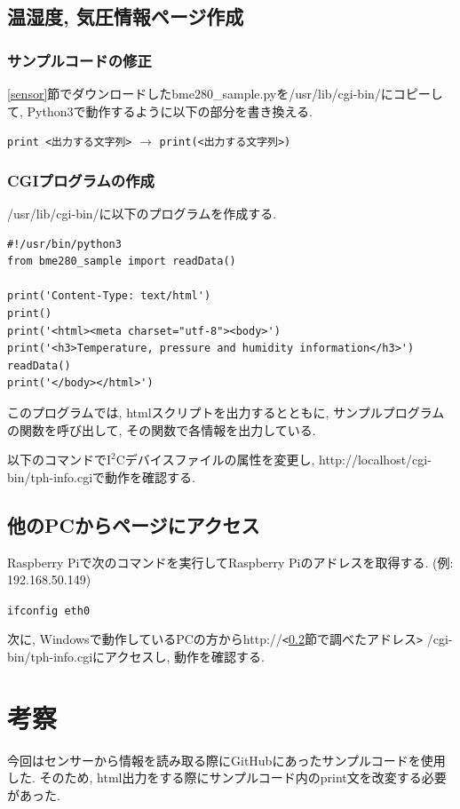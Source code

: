 \documentclass[titlepage]{jsarticle}
\begin{document}
    \subsection{温湿度, 気圧情報ページ作成}
        \subsubsection{サンプルコードの修正}
            \ref{sensor}節でダウンロードしたbme280\_sample.pyを/usr/lib/cgi-bin/にコピーして,
            Python3で動作するように以下の部分を書き換える.

            \verb|print <出力する文字列>| $\longrightarrow$ \verb|print(<出力する文字列>)|

        \subsubsection{CGIプログラムの作成}
            /usr/lib/cgi-bin/に以下のプログラムを作成する.
            
            \begin{lstlisting}[caption=tph-info.cgi]
#!/usr/bin/python3
from bme280_sample import readData()

print('Content-Type: text/html')
print()
print('<html><meta charset="utf-8"><body>')
print('<h3>Temperature, pressure and humidity information</h3>')
readData()
print('</body></html>')
            \end{lstlisting}

            このプログラムでは, htmlスクリプトを出力するとともに, 
            サンプルプログラムの関数を呼び出して, その関数で各情報を出力している.

            以下のコマンドで$\mathrm I^2 \mathrm C$デバイスファイルの属性を変更し,
            http://localhost/cgi-bin/tph-info.cgiで動作を確認する.

    \subsection{他のPCからページにアクセス} \label{ip}
        Raspberry Piで次のコマンドを実行してRaspberry Piのアドレスを取得する.
        (例: 192.168.50.149)

        \verb|ifconfig eth0|

        次に, Windowsで動作しているPCの方からhttp://\verb|<|\ref{ip}節で調べたアドレス\verb|>|
        /cgi-bin/tph-info.cgiにアクセスし, 動作を確認する.

\section{考察}
    今回はセンサーから情報を読み取る際にGitHubにあったサンプルコードを使用した.
    そのため, html出力をする際にサンプルコード内のprint文を改変する必要があった.
\end{document}
